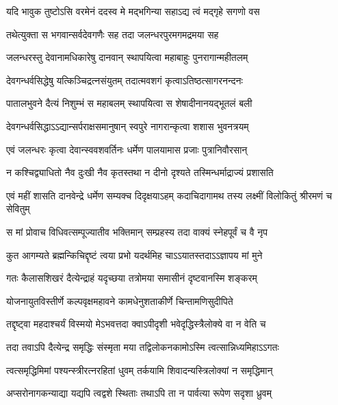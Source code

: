 \twolineshloka
{यदि भावुक तुष्टोऽसि वरमेनं ददस्व मे}
{मद्भगिन्या सहाऽद्य त्वं मद्गृहे सगणो वस} %


\twolineshloka
{तथेत्युक्ता स भगवान्सर्वदेवगणैः सह}
{तदा जलन्धरपुरमगमद्रमया सह} %

\twolineshloka
{जलन्धरस्तु देवानामधिकारेषु दानवान्}
{स्थापयित्वा महाबाहुः पुनरागान्महीतलम्} %

\twolineshloka
{देवगन्धर्वसिद्धेषु यत्किञ्चिद्रत्नसंयुतम्}
{तदात्मवशगं कृत्वाऽतिष्ठत्सागरनन्दनः} %

\twolineshloka
{पातालभुवने दैत्यं निशुम्भं स महाबलम्}
{स्थापयित्वा स शेषादीनानयद्भूतलं बली} %

\twolineshloka
{देवगन्धर्वसिद्धाऽऽद्यान्सर्पराक्षसमानुषान्}
{स्वपुरे नागरान्कृत्वा शशास भुवनत्रयम्} %

\twolineshloka
{एवं जलन्धरः कृत्वा देवान्स्ववशवर्तिनः}
{धर्मेण पालयामास प्रजाः पुत्रानिवौरसान्} %

\twolineshloka
{न कश्चिद्व्याधितो नैव दुःखी नैव कृतस्तथा}
{न दीनो दृश्यते तस्मिन्धर्माद्राज्यं प्रशासति} %

\twolineshloka
{एवं महीं शासति दानवेन्द्रे धर्मेण सम्यक्च दिदृक्षयाऽहम्}
{कदाचिदागामथ तस्य लक्ष्मीं विलोकितुं श्रीरमणं च सेवितुम्} %





\twolineshloka
{स मां प्रोवाच विधिवत्सम्पूज्यातीव भक्तिमान्}
{सम्प्रहस्य तदा वाक्यं स्नेहपूर्वं च वै नृप} %

\twolineshloka
{कुत आगम्यते ब्रह्मन्किचिद्दृष्टं त्वया प्रभो}
{यदर्थमिह चाऽऽयातस्तदाऽऽज्ञापय मां मुने} %


\twolineshloka
{गतः कैलासशिखरं दैत्येन्द्राहं यदृच्छया}
{तत्रोमया समासीनं दृष्टवानस्मि शङ्करम्} %

\twolineshloka
{योजनायुतविस्तीर्णे कल्पवृक्षमहावने}
{कामधेनुशताकीर्णे चिन्तामणिसुदीपिते} %

\twolineshloka
{तद्दृष्ट्वा महदाश्चर्यं विस्मयो मेऽभवत्तदा}
{क्वाऽपीदृशी भवेदृद्धिस्त्रैलोक्ये वा न वेति च} %

\twolineshloka
{तदा तवाऽपि दैत्येन्द्र समृद्धिः संस्मृता मया}
{तद्विलोकनकामोऽस्मि त्वत्सान्निध्यमिहाऽऽगतः} %

\twolineshloka
{त्वत्समृद्धिमिमां पश्यन्स्त्रीरत्नरहितां धुवम्}
{तर्कयामि शिवादन्यस्त्रिलोक्यां न समृद्धिमान्} %

\twolineshloka
{अप्सरोनागकन्याद्या यद्यपि त्वद्वशे स्थिताः}
{तथाऽपि ता न पार्वत्या रूपेण सदृशा ध्रुवम्} %

